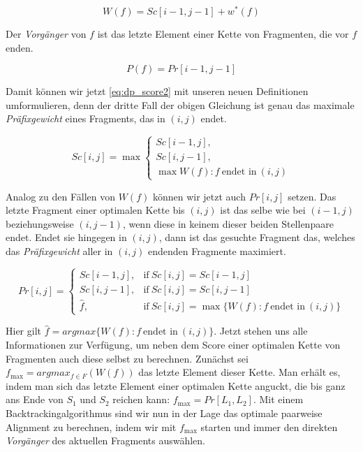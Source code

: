 \begin{equation}\label{eq:praefixgewicht}
	W(f) = Sc[i\!-\!1,j\!-\!1]+w^*(f)
\end{equation}

Der \emph{Vorgänger} von $f$ ist das letzte Element einer Kette von Fragmenten, die vor $f$ enden.

\begin{equation}\label{eq:vorgaenger}
	P(f) = Pr[i\!-\!1,j\!-\!1]
\end{equation}

Damit können wir jetzt \eqref{eq:dp_score2} mit unseren neuen Definitionen umformulieren, denn der dritte Fall der obigen Gleichung ist genau das maximale \emph{Präfixgewicht} eines Fragments, das in $(i,j)$ endet.

\begin{equation}\label{eq:praefixgewicht2}
	Sc[i,j] = \max
		\begin{cases}
		Sc[i\!-\!1,j], \\
		Sc[i,j\!-\!1], \\
		\max{W(f): f\: \text{endet in}\: (i,j)}
	\end{cases}	
\end{equation}

Analog zu den Fällen von $W(f)$ können wir jetzt auch $Pr[i,j]$ setzen. Das letzte Fragment einer optimalen Kette bis $(i,j)$ ist das selbe wie bei $(i-1,j)$ beziehungsweise $(i,j-1)$, wenn diese in keinem dieser beiden Stellenpaare endet. Endet sie hingegen in $(i,j)$, dann ist das gesuchte Fragment das, welches das \emph{Präfixgewicht} aller in $(i,j)$ endenden Fragmente maximiert.

\begin{equation}\label{eq:vorgaenger2}
	Pr[i,j] =
		\begin{cases}
			Sc[i-1,j], & \text{if}\: Sc[i,j] = Sc[i\!-\!1,j]\\
			Sc[i,j-1], & \text{if}\: Sc[i,j] = Sc[i,j\!-\!1]\\
			\hat{f},   & \text{if}\: Sc[i,j] = \max{\{W(f) : f\: \text{endet in}\: (i,j)\}}
		\end{cases}	
\end{equation}

Hier gilt $\hat{f} = argmax\{W(f) : f\: \text{endet in}\: (i,j) \}$. Jetzt stehen uns alle Informationen zur Verfügung, um neben dem Score einer optimalen Kette von Fragmenten auch diese selbst zu berechnen. Zunächst sei $f_{\max} = argmax_{f\in F}(W(f))$ das letzte Element dieser Kette. Man erhält es, indem man sich das letzte Element einer optimalen Kette anguckt, die bis ganz ans Ende von $S_1$ und $S_2$ reichen kann: $f_{\max} = Pr[L_1,L_2]$. Mit einem Backtrackingalgorithmus sind wir nun in der Lage das optimale paarweise Alignment zu berechnen, indem wir mit $f_{\max}$ starten und immer den direkten \emph{Vorgänger} des aktuellen Fragments auswählen.

